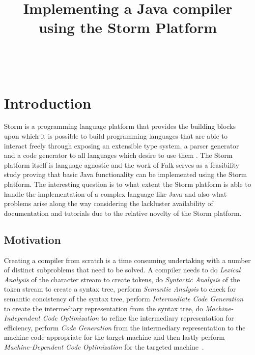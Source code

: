 \documentclass{sigchi}
\def\plaintitle{Implementing a Java compiler using the Storm Platform}
\begin{document}
\title{\plaintitle}

\author{%
  \\
  \\
}

\maketitle
\section{Introduction}
Storm is a programming language platform that provides the building blocks upon which it is possible to build programming languages that are able to interact freely through exposing an extensible type system, a parser generator and a code generator to all languages which desire to use them \cite{stromback:2018}. The Storm platform itself is language agnostic and the work of Falk\cite{} serves as a feasibility study proving that basic Java functionality can be implemented using the Storm platform.
The interesting question is to what extent the Storm platform is able to handle the implementation of a complex language like Java and also what problems arise along the way considering the lackluster availability of documentation and tutorials due to the relative novelty of the Storm platform.

\subsection{Motivation}
Creating a compiler from scratch is a time consuming undertaking with a number of distinct subproblems that need to be solved. A compiler needs to do \emph{Lexical Analysis} of the character stream to create tokens, do \emph{Syntactic Analysis} of the token stream to create a syntax tree, perform \emph{Semantic Analysis} to check for semantic concistency of the syntax tree, perform \emph{Intermediate Code Generation} to create the intermediary representation from the syntax tree, do \emph{Machine-Independent Code Optimization} to refine the intermediary representation for efficiency, perform \emph{Code Generation} from the intermediary representation to the machine code appropriate for the target machine and then lastly perform \emph{Machine-Dependent Code Optimization} for the targeted machine~\cite{dragon}.
\end{document}
